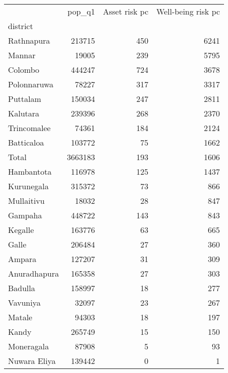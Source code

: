 \begin{tabular}{lrrr}
\toprule
{} &   pop\_q1 &  Asset risk pc &  Well-being risk pc \\
district     &          &                &                     \\
\midrule
Rathnapura   &   213715 &            450 &                6241 \\
Mannar       &    19005 &            239 &                5795 \\
Colombo      &   444247 &            724 &                3678 \\
Polonnaruwa  &    78227 &            317 &                3317 \\
Puttalam     &   150034 &            247 &                2811 \\
Kalutara     &   239396 &            268 &                2370 \\
Trincomalee  &    74361 &            184 &                2124 \\
Batticaloa   &   103772 &             75 &                1662 \\
Total        &  3663183 &            193 &                1606 \\
Hambantota   &   116978 &            125 &                1437 \\
Kurunegala   &   315372 &             73 &                 866 \\
Mullaitivu   &    18032 &             28 &                 847 \\
Gampaha      &   448722 &            143 &                 843 \\
Kegalle      &   163776 &             63 &                 665 \\
Galle        &   206484 &             27 &                 360 \\
Ampara       &   127207 &             31 &                 309 \\
Anuradhapura &   165358 &             27 &                 303 \\
Badulla      &   158997 &             18 &                 277 \\
Vavuniya     &    32097 &             23 &                 267 \\
Matale       &    94303 &             18 &                 197 \\
Kandy        &   265749 &             15 &                 150 \\
Moneragala   &    87908 &              5 &                  93 \\
Nuwara Eliya &   139442 &              0 &                   1 \\
\bottomrule
\end{tabular}
